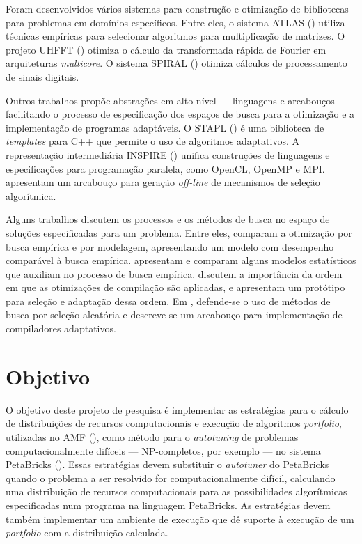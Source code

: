 \documentclass[a4paper, 11pt]{article}
\begin{document}
Foram desenvolvidos vários sistemas para construção e otimização de bibliotecas
para problemas em domínios específicos. Entre eles, o sistema ATLAS 
(\citet{whaley1998, whaley2005}) utiliza técnicas empíricas para selecionar
algoritmos para multiplicação de matrizes. O projeto UHFFT 
(\citet{ali2007scheduling}) otimiza o cálculo da transformada rápida
de Fourier em arquiteturas \emph{multicore}. O sistema SPIRAL 
(\citet{puschel2005spiral}) otimiza cálculos de processamento de sinais
digitais.

Outros trabalhos propõe abstrações em alto nível --- linguagens e arcabouços 
--- facilitando o processo de especificação dos espaços de busca para a 
otimização e a implementação de programas adaptáveis. O STAPL 
(\citet{thomas2005stapl}) é uma biblioteca de \emph{templates} para C++
que permite o uso de algoritmos adaptativos. A representação intermediária
INSPIRE (\citet{jordan2013inspire}) unifica construções de linguagens e 
especificações para programação paralela, como OpenCL, OpenMP e MPI.
\citet{yu2004adaptive} apresentam um arcabouço para geração \emph{off-line}
de mecanismos de seleção algorítmica.

Alguns trabalhos discutem os processos e os métodos de busca no espaço
de soluções especificadas para um problema. Entre eles,
\citet{yotov2003} comparam a otimização por busca empírica e por 
modelagem, apresentando um modelo com desempenho comparável à busca empírica.
\citet{vuduc2004} apresentam e comparam alguns
modelos estatísticos que auxiliam no processo de busca empírica.
\citet{cooper2002compilation} discutem a importância da
ordem em que as otimizações de compilação são aplicadas, e apresentam
um protótipo para seleção e adaptação dessa ordem.
Em \citet{cooper2002adaptive}, defende-se o uso de métodos de busca
por seleção aleatória e descreve-se um arcabouço para implementação
de compiladores adaptativos.

\section{Objetivo} \label{sec:obj}

O objetivo deste projeto de pesquisa é implementar as estratégias para o 
cálculo de distribuições de recursos computacionais e execução de algoritmos 
\emph{portfolio}, utilizadas no AMF (\citet{goldman2012framework}), como método
para o \emph{autotuning} de problemas computacionalmente difíceis --- 
NP-completos, por exemplo --- no sistema PetaBricks (\citet{ansel2014phd}).
Essas estratégias devem substituir o \emph{autotuner} do PetaBricks quando o 
problema a ser resolvido for computacionalmente difícil, calculando uma
distribuição de recursos computacionais para as possibilidades algorítmicas 
especificadas num programa na linguagem PetaBricks. As estratégias devem também
implementar um ambiente de execução que dê suporte à execução de um 
\emph{portfolio} com a distribuição calculada.
\end{document}
